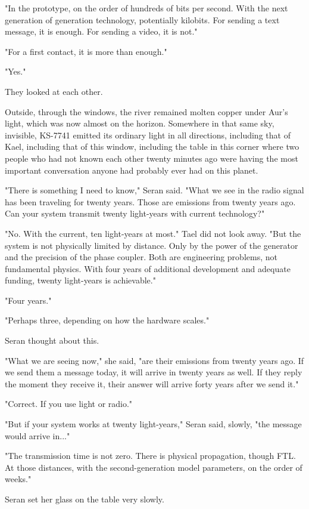\documentclass[11pt,a5paper,twoside]{book}
\begin{document}
"In the prototype, on the order of hundreds of bits per second. With the next generation of generation technology, potentially kilobits. For sending a text message, it is enough. For sending a video, it is not."

"For a first contact, it is more than enough."

"Yes."

They looked at each other.

Outside, through the windows, the river remained molten copper under Aur’s light, which was now almost on the horizon. Somewhere in that same sky, invisible, KS-7741 emitted its ordinary light in all directions, including that of Kael, including that of this window, including the table in this corner where two people who had not known each other twenty minutes ago were having the most important conversation anyone had probably ever had on this planet.

"There is something I need to know," Seran said. "What we see in the radio signal has been traveling for twenty years. Those are emissions from twenty years ago. Can your system transmit twenty light-years with current technology?"

"No. With the current, ten light-years at most." Tael did not look away. "But the system is not physically limited by distance. Only by the power of the generator and the precision of the phase coupler. Both are engineering problems, not fundamental physics. With four years of additional development and adequate funding, twenty light-years is achievable."

"Four years."

"Perhaps three, depending on how the hardware scales."

Seran thought about this.

"What we are seeing now," she said, "are their emissions from twenty years ago. If we send them a message today, it will arrive in twenty years as well. If they reply the moment they receive it, their answer will arrive forty years after we send it."

"Correct. If you use light or radio."

"But if your system works at twenty light-years," Seran said, slowly, "the message would arrive in..."

"The transmission time is not zero. There is physical propagation, though FTL. At those distances, with the second-generation model parameters, on the order of weeks."

Seran set her glass on the table very slowly.
\end{document}
